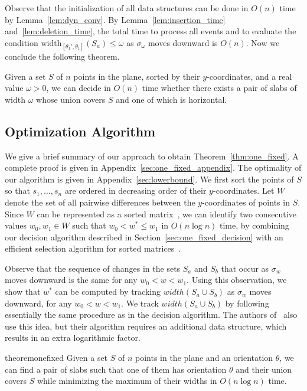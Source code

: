 \documentclass[english,a4paper, cleveref, autoref, thm-restate, nolineno]{socg-lipics-v2021}
\theoremstyle{star}
\theoremstyle{claimstar}
\newcommand{\width}{\ensuremath{\mathrm{width}}}
\begin{document}
Observe that the initialization of all data structures can be done in $O(n)$ time by Lemma~\ref{lem:dyn_conv}.
By Lemma~\ref{lem:insertion_time} and~\ref{lem:deletion_time}, the total time to process all events and to evaluate the condition $\width_{[\theta_1', \theta_1]}(S_a) \le \omega$ as $\sigma_\omega$ moves downward is $O(n)$. Now we conclude the following theorem.

\begin{theorem}
    \label{thm:one_fixed_decision}
    Given a set $S$ of $n$ points in the plane, sorted by their $y$-coordinates, and a real value $\omega > 0$, we can decide in $O(n)$ time whether there exists a pair of slabs of width $\omega$ whose union covers $S$ and one of which is horizontal.
\end{theorem}


\subsection{Optimization Algorithm}
\label{sec:one_fixed_optimization}

We give a brief summary of our approach to obtain Theorem~\ref{thm:one_fixed}. A complete proof is given in Appendix~\ref{sec:one_fixed_appendix}. The optimality of our algorithm is given in Appendix~\ref{sec:lowerbound}.
We first sort the points of $S$ so that $s_1, \ldots, s_n$ are ordered in decreasing order of their $y$-coordinates.
Let $W$ denote the set of all pairwise differences between the $y$-coordinates of points in $S$.
Since $W$ can be represented as a sorted matrix~\cite{frederickson1982complexity}, we can identify two consecutive values $w_0, w_1 \in W$ such that $w_0 < w^* \le w_1$ in $O(n \log n)$ time, by combining our decision algorithm described in Section~\ref{sec:one_fixed_decision} with an efficient selection algorithm for sorted matrices~\cite{frederickson1984generalized}.

Observe that the sequence of changes in the sets $S_a$ and $S_b$ that occur as $\sigma_w$ moves downward is the same for any $w_0 <w<w_1$.
Using this observation, we show that $w^*$ can be computed by tracking ${width}(S_a \cup S_b)$ as $\sigma_w$ moves downward, for any $w_0 < w < w_1$. 
We track ${width}(S_a \cup S_b)$ by following essentially the same procedure as in the decision algorithm. 
The authors of~\cite{ahn2024constrained} also use this idea, but their algorithm requires an additional data structure, which results in an extra logarithmic factor.


\begin{restatable}{theorem}{onefixed}
    \label{thm:one_fixed}
    Given a set $S$ of $n$ points in the plane and an orientation $\theta$, we can find a pair of slabs such that one of them has orientation $\theta$ and their union covers $S$ while minimizing the maximum of their widths in $O(n\log n)$ time.
\end{restatable}
\end{document}
